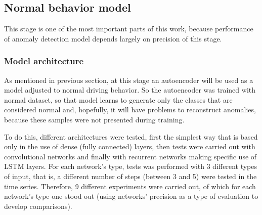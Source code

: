 \subsection{Normal behavior model}

This stage is one of the most important parts of this work, because performance of anomaly detection model depends largely on precision of this stage.

\subsubsection{Model architecture}

As mentioned in previous section, at this stage an autoencoder will be used as a model adjusted to normal driving behavior. So the autoencoder was trained with normal dataset, so that model learns to generate only the classes that are considered normal and, hopefully, it will have problems to reconstruct anomalies, because these samples were not presented during training.

\vspace{5mm} %

To do this, different architectures were tested, first the simplest way that is based only in the use of dense (fully connected) layers, then tests were carried out with convolutional networks and finally with recurrent networks making specific use of LSTM layers. For each network's type, tests was performed with 3 different types of input, that is, a different number of steps (between 3 and 5) were tested in the time series. Therefore, 9 different experiments were carried out, of which for each network's type one stood out (using networks' precision as a type of evaluation to develop comparisons).

